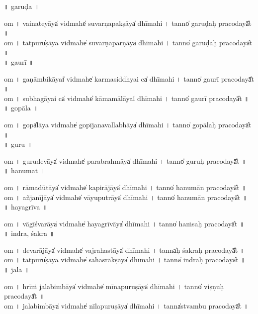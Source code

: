 \documentclass[parskip, DIV=14]{scrartcl}
\begin{document}
\vspace{0.201cm} ॥   garuḍa  ॥ \par
  om  । vai॒na॒te॒yāya̍ vi॒dmahe̍ suvarṇapa॒kṣāya̍ dhīmahi  ।  tanno̍ garuḍaḥ praco॒dayā̎t ॥ \\
  om  । tatpuru̍ṣāya vi॒dmahe̍ suvarṇapa॒rṇāya̍  dhīmahi  ।  tanno̍ garuḍaḥ praco॒dayā̎t ॥ \\

\vspace{0.201cm} ॥   gaurī  ॥ \par
  om  । ga॒ṇā॒mbi॒kāyai̍ vi॒dmahe̍ karmasi॒ddhyai ca̍ dhīmahi  ।  tanno̍ gaurī praco॒dayā̎t ॥ \\
  om  । su॒bha॒gā॒yai ca̍ vi॒dmahe̍ kāmamā॒lāyai̍ dhīmahi  ।  tanno̍ gaurī praco॒dayā̎t ॥ \\

\vspace{0.201cm} ॥   gopāla  ॥ \par
  om  । gopā̍lāya vi॒dmahe̍ gopījanavalla॒bhāya̍ dhīmahi  ।  tanno̍ gopālaḥ praco॒dayā̎t ॥ \\

\vspace{0.201cm} ॥   guru  ॥ \par
  om  । gu॒ru॒de॒vāya̍ vi॒dmahe̍ parabra॒hmāya̍ dhīmahi  ।  tanno̍ guruḥ praco॒dayā̎t ॥ \\

\vspace{0.201cm} ॥   hanumat  ॥ \par
  om  । rā॒ma॒dū॒tāya̍ vi॒dmahe̍ kapirā॒jāya̍ dhīmahi  ।  tanno̍ hanumān praco॒dayā̎t ॥ \\
  om  । a॒ñja॒nī॒jāya̍ vi॒dmahe̍ vāyupu॒trāya̍ dhīmahi  ।  tanno̍ hanumān praco॒dayā̎t ॥ \\

\vspace{0.201cm} ॥   hayagrīva  ॥ \par
  om  । vā॒gī॒śva॒rāya̍ vi॒dmahe̍ hayagrī॒vāya̍ dhīmahi  ।  tanno̍ haṁsaḥ praco॒dayā̎t ॥ \\

\vspace{0.201cm} ॥   indra, śakra  ॥ \par
  om  । de॒va॒rā॒jāya̍ vi॒dmahe̍ vajraha॒stāya̍ dhīmahi  ।  tanna̍ḥ śakraḥ praco॒dayā̎t ॥ \\
  om  । tatpuru̍ṣāya vi॒dmahe̍ sahasrā॒kṣāya̍ dhīmahi  ।  tanna̍ indraḥ praco॒dayā̎t ॥ \\

\vspace{0.201cm} ॥   jala  ॥ \par
  om  । hrīṁ ja॒la॒bi॒mbāya̍ vi॒dmahe̍ mīnapuru॒ṣāya̍ dhīmahi  ।  tanno̍ viṣṇuḥ praco॒dayā̎t ॥ \\
  om  । ja॒la॒bi॒mbāya̍ vi॒dmahe̍  nīlapuru॒ṣāya̍ dhīmahi  ।  tanna̍stvambu praco॒dayā̎t ॥ \\
\end{document}
